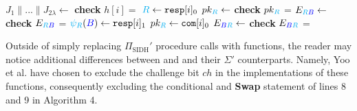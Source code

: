 \begin{algorithm}[H]
\caption{-- }\label{alg:verifcode}
\begin{algorithmic}[1]
\State $J_{1} \parallel ... \parallel J_{2\lambda} \gets$ 
	\State \textbf{check} $h[i] =$ 
		\State $\textcolor{cyan}{R} \gets \texttt{resp}[i]_{0}$
		\State $pk_{\textcolor{cyan}{R}} \gets$ 
		\State \textbf{check} $pk_{\textcolor{cyan}{R}}$ = 
		\State $E_{\textcolor{cyan}{R}\textcolor{blue}{B}} \gets$ 
		\State \textbf{check} $E_{\textcolor{cyan}{R}\textcolor{blue}{B}}$ = 
	\Else
		\State $\textcolor{cyan}{\psi_R}(\textcolor{blue}{B}) \gets \texttt{resp}[i]_{1}$
		\State $pk_{\textcolor{cyan}{R}} \gets \texttt{com}[i]_{0}$
		\State $E_{\textcolor{blue}{B}\textcolor{cyan}{R}} \gets$ 
		\State \textbf{check} $E_{\textcolor{blue}{B}\textcolor{cyan}{R}}$ = 
	\EndIf
\EndFor

	\State {}
\Else
	\State {}
\EndIf
\end{algorithmic}
\end{algorithm}

Outside of simply replacing $\Pi_{\text{SIDH}}'$ procedure calls with \sidh functions, the reader may notice additional differences between  and  and their $\Sigma'$ counterparts. Namely, Yoo et al. have chosen to exclude the challenge bit $ch$ in the \sidh implementations of these functions, consequently excluding the conditional and \textbf{Swap} statement of lines 8 and 9 in Algorithm 4. 


